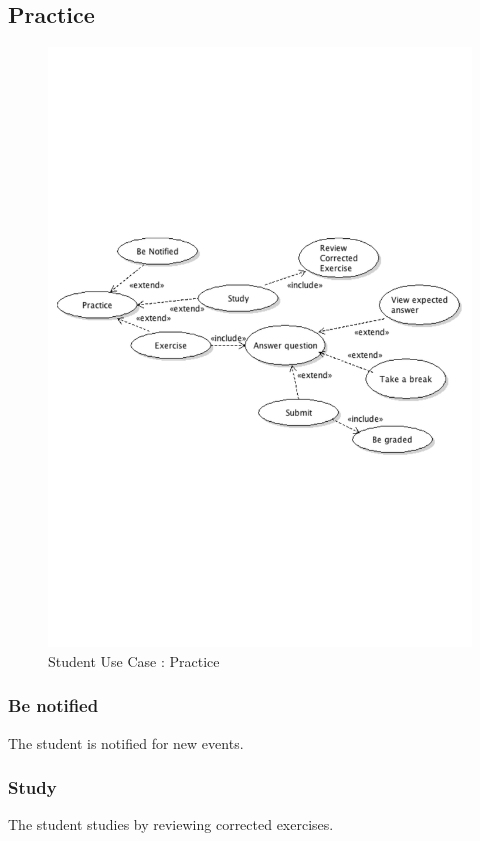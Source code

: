 	\subsection{Practice}
		\begin{figure}[ht]
			\begin{center}
				\includegraphics[width=\textwidth,  trim=2cm 10cm 2cm 10cm]{UML_figure/UC/student/UC_Student_Practice.pdf}
				\caption{Student Use Case : Practice}
			\end{center}
		\end{figure}
		\subsubsection{Be notified}
			The student is notified for new events.
		\subsubsection{Study}
			The student studies by reviewing corrected exercises.
